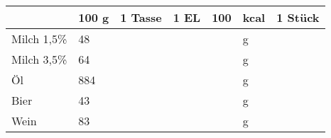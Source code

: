 \begin{tabularx}{\linewidth}{X|l|r|r|rl|r}
                  &   100 g & 1 Tasse & 1 EL &      100 & kcal    & 1 Stück  \\
\hline
Milch 1,5\%       &      48 &         &      &          & g       &          \\
Milch 3,5\%       &      64 &         &      &          & g       &          \\
Öl                &     884 &         &      &          & g       &          \\
Bier              &      43 &         &      &          & g       &          \\
Wein              &      83 &         &      &          & g       &          \\
\end{tabularx}
